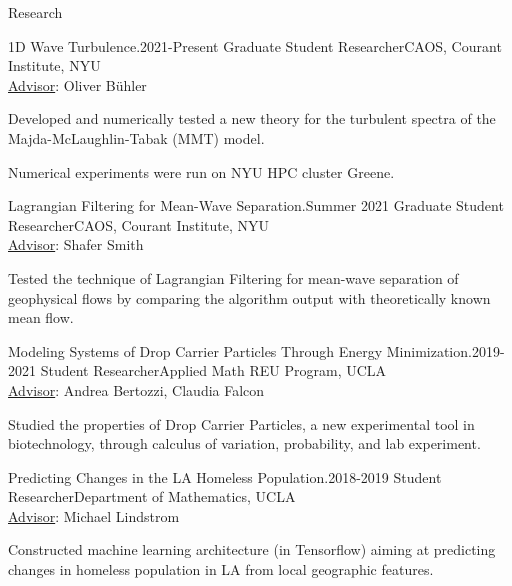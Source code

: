 \documentclass{resume} %
\begin{document}

\begin{rSection}{Research}

\begin{rSubsection}{1D Wave Turbulence.}{2021-Present}
{Graduate Student Researcher}{CAOS, Courant Institute, NYU\\\underline{Advisor}: Oliver B\"uhler}
\item Developed and numerically tested a new theory for the turbulent spectra of the Majda-McLaughlin-Tabak (MMT) model.
\item Numerical experiments were run on NYU HPC cluster Greene.
\end{rSubsection}

\begin{rSubsection}{Lagrangian Filtering for Mean-Wave Separation.}{Summer 2021}
{Graduate Student Researcher}{CAOS, Courant Institute, NYU\\\underline{Advisor}: Shafer Smith}
\item Tested the technique of Lagrangian Filtering for mean-wave separation of geophysical flows by comparing the algorithm output with theoretically known mean flow.
\end{rSubsection}

\begin{rSubsection}{Modeling Systems of Drop Carrier Particles Through Energy
Minimization.}{2019-2021}
{Student Researcher}{Applied Math REU Program, UCLA\\\underline{Advisor}: Andrea Bertozzi, Claudia Falcon}
\item Studied the properties of Drop Carrier Particles, a new experimental tool in biotechnology, through calculus of variation, probability, and lab experiment.
\end{rSubsection}

\begin{rSubsection}{Predicting Changes in the LA Homeless Population.}{2018-2019}
{Student Researcher}{Department of Mathematics, UCLA\\\underline{Advisor}: Michael Lindstrom}
\item Constructed machine learning architecture (in Tensorflow) aiming at predicting changes in homeless population in LA from local geographic features. 
\end{rSubsection}

\end{rSection}
\end{document}
